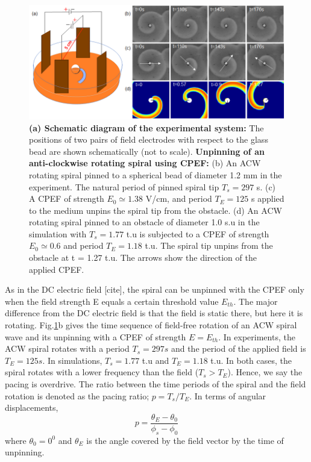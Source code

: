 \documentclass[%
 preprint,
 amsmath,amssymb,
 aps,
]{revtex4-2}
\begin{document}
\begin{figure}[H]
    \centering
    \includegraphics[scale=0.7]{new_fig.png}
    \caption{\textbf{(a) Schematic diagram of the experimental system:} The positions of two pairs of field electrodes with respect to the glass bead are shown schematically (not to scale).
    \textbf{Unpinning of an anti-clockwise rotating spiral using CPEF:}  (b) An ACW rotating spiral pinned to a spherical bead of diameter 1.2 mm in the experiment. The natural period of pinned spiral tip $T_{s} = 297 $ s. (c) A CPEF of strength $E_0 \simeq 1.38$ V/cm, and period $T_{E} = 125$ s applied to the medium unpins the spiral tip from the obstacle. 
    (d) An ACW rotating spiral pinned to an obstacle of diameter 1.0 s.u in the simulation with $T_{s} = 1.77$ t.u is subjected to a CPEF of strength $E_0 \simeq 0.6 $ and period $T_{E} =1.18$ t.u. The spiral tip unpins from the obstacle at t = 1.27 t.u.
    The arrows show the direction of the applied CPEF.}
    \label{fig:unpinning_images}
\end{figure}
 
As in the DC electric field [cite], the spiral can be unpinned with the CPEF only when the field strength E equals a certain threshold value $E_{th}$. The major difference from the DC electric field is that the field is static there, but here it is rotating.
Fig.\ref{fig:unpinning_images}b gives the time sequence of field-free rotation of an ACW spiral wave and its unpinning with a CPEF of strength $E = E_{th}$. 
In experiments, the ACW spiral rotates with a period $T_{s} = 297 s$ and the period of the applied field is $T_{E} = 125 s$. In simulations, $T_{s} = 1.77$ t.u and $T_{E} =1.18$ t.u. In both cases, the spiral rotates with a lower frequency than the field ($T_{s} > T_{E}$). Hence, we say the pacing is overdrive. The ratio between the time periods of the spiral and the field rotation is denoted as the pacing ratio; $p = T_{s}/T_{E}$. In terms of angular displacements,
\begin{equation}
p = \frac{\theta_{E} - \theta_{0}}{\phi_{s} - \phi_{0}}
\label{p_theta_phi}
\end{equation}
where $\theta_{0} = 0^0$ and $\theta_{E}$ is the angle covered by the field vector by the time of unpinning.
\end{document}
